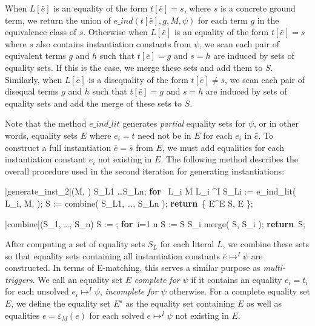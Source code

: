 \documentclass{llncs}
\def\RETURN{\keyword{return}\ }
\def\ENDPROC{\untab}
\def\DOFOR{\qtab\keyword{for}\ }
\def\ENDFOR{\untab}
\def\keyword#1{\mbox{\normalshape\bf #1}}
\begin{document}
When $L[\bar{e}]$ is an equality of the form $t[\bar{e}] = s$, where $s$ is a concrete ground term, we return the union of $e\_ind( t[\bar{e}], g, M, \psi )$ for each term $g$ in the equivalence class of $s$.
Otherwise when $L[\bar{e}]$ is an equality of the form $t[\bar{e}] = s$ where $s$ also contains instantiation constants from $\psi$, we scan each pair of equivalent terms $g$ and $h$ such that $t[\bar{e}] = g$ and $s = h$ are induced by sets of equality sets.
If this is the case, we merge these sets and add them to $S$.
Similarly, when $L[\bar{e}]$ is a disequality of the form $t[\bar{e}] \neq s$, we scan each pair of disequal terms $g$ and $h$ such that $t[\bar{e}] = g$ and $s = h$ are induced by sets of equality sets and add the merge of these sets to $S$.

Note that the method $e\_ind\_lit$ generates \emph{partial} equality sets for $\psi$, or in other words, equality sets $E$ where $e_i = t$ need not be in $E$ for each $e_i$ in $\bar{e}$.
To construct a full instantiation $\bar{e} = \bar{s}$ from $E$, we must add equalities for each instantiation constant $e_i$ not existing in $E$.
The following method describes the overall procedure used in the second iteration for generating instantiations:

\begin{minipage}[t]{.4\linewidth}
\begin{program}
\PROC |generate\_inst_2|(M, \psi) \BODY
S_{L1} \ldots S_{Ln};
\DOFOR {} L_i \in M  L_i \mapsto^I \psi
  S_{Li} := e\_ind\_lit( L_i, M, \psi );
\ENDFOR
S := combine( S_{L1}, \ldots, S_{Ln} );
\RETURN \{ E^\varepsilon \mid E \in S, E  \};
\ENDPROC
\end{program}
\end{minipage}
\begin{minipage}[t]{.4\linewidth}
\begin{program}
\PROC |combine|(S_1, \ldots, S_n) \BODY
S := \emptyset;
\DOFOR i=1 \TO n
  S := S \cup S_i \cup merge( S, S_i );
\ENDFOR
\RETURN S;
\ENDPROC
\end{program}
\end{minipage}

After computing a set of equality sets $S_L$ for each literal $L$, we combine these sets so that equality sets containing all instantiation constants $\bar{e} \mapsto^I \psi$ are constructed.
In terms of E-matching, this serves a similar purpose as \emph{multi-triggers}.
We call an equality set $E$ \emph{complete for $\psi$} if it contains an equality $e_i = t_i$ for each unsolved $e_i \mapsto^I \psi$, \emph{incomplete for $\psi$} otherwise.
For a complete equality set $E$, we define the equality set $E^\varepsilon$ as the equality set containing $E$ as well as equalities $ e = \varepsilon_M( e )$ for each solved $e \mapsto^I \psi$ not existing in $E$.
\end{document}
